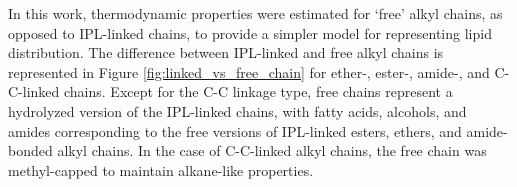 
In this work, thermodynamic properties were estimated for `free' alkyl chains, as opposed to IPL-linked chains, to provide a simpler model for representing lipid distribution. The difference between IPL-linked and free alkyl chains is represented in Figure \ref{fig:linked_vs_free_chain} for ether-, ester-, amide-, and C-C-linked chains. Except for the C-C linkage type, free chains represent a hydrolyzed version of the IPL-linked chains, with fatty acids, alcohols, and amides corresponding to the free versions of IPL-linked esters, ethers, and amide-bonded alkyl chains. In the case of C-C-linked alkyl chains, the free chain was methyl-capped to maintain alkane-like properties.

